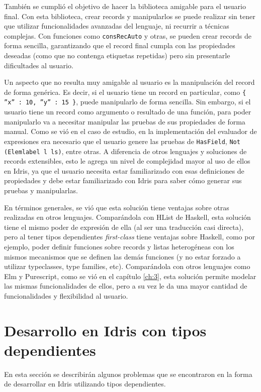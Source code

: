También se cumplió el objetivo de hacer la biblioteca amigable para el usuario final. Con esta biblioteca, crear records y manipularlos se puede realizar sin tener que utilizar funcionalidades avanzadas del lenguaje, ni recurrir a técnicas complejas. Con funciones como \texttt{consRecAuto} y otras, se pueden crear records de forma sencilla, garantizando que el record final cumpla con las propiedades deseadas (como que no contenga etiquetas repetidas) pero sin presentarle dificultades al usuario.

Un aspecto que no resulta muy amigable al usuario es la manipulación del record de forma genérica. Es decir, si el usuario tiene un record en particular, como \texttt{\{ ''x'' : 10, ''y'' : 15 \}}, puede manipularlo de forma sencilla. Sin embargo, si el usuario tiene un record como argumento o resultado de una función, para poder manipularlo va a necesitar manipular las pruebas de sus propiedades de forma manual. Como se vió en el caso de estudio, en la implementación del evaluador de expresiones era necesario que el usuario genere las pruebas de \texttt{HasField}, \texttt{Not (Elemlabel l ls)}, entre otras. A diferencia de otros lenguajes y soluciones de records extensibles, esto le agrega un nivel de complejidad mayor al uso de ellos en Idris, ya que el usuario necesita estar familiarizado con esas definiciones de propiedades y debe estar familiarizado con Idris para saber cómo generar sus pruebas y manipularlas.

En términos generales, se vió que esta solución tiene ventajas sobre otras realizadas en otros lenguajes. Comparándola con HList de Haskell, esta solución tiene el mismo poder de expresión de ella (al ser una traducción casi directa), pero al tener tipos dependientes \textit{first-class} tiene ventajas sobre Haskell, como por ejemplo, poder definir funciones sobre records y listas heterogéneas con los mismos mecanismos que se definen las demás funciones (y no estar forzado a utilizar typeclasses, type families, etc). Comparándola con otros lenguajes como Elm y Purescript, como se vió en el capítulo \ref{ch:3}, esta solución permite modelar las mismas funcionalidades de ellos, pero a su vez le da una mayor cantidad de funcionalidades y flexibilidad al usuario.

\section{Desarrollo en Idris con tipos dependientes}

En esta sección se describirán algunos problemas que se encontraron en la forma de desarrollar en Idris utilizando tipos dependientes.

